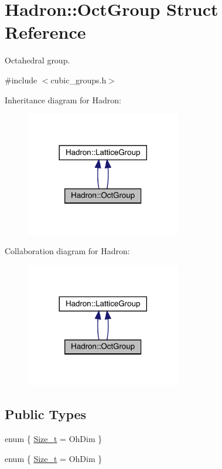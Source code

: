 \hypertarget{structHadron_1_1OctGroup}{}\section{Hadron\+:\+:Oct\+Group Struct Reference}
\label{structHadron_1_1OctGroup}


Octahedral group.  




{\ttfamily \#include $<$cubic\+\_\+groups.\+h$>$}



Inheritance diagram for Hadron\+:\nopagebreak
\begin{figure}[H]
\begin{center}
\leavevmode
\includegraphics[width=192pt]{da/da9/structHadron_1_1OctGroup__inherit__graph}
\end{center}
\end{figure}


Collaboration diagram for Hadron\+:\nopagebreak
\begin{figure}[H]
\begin{center}
\leavevmode
\includegraphics[width=192pt]{df/d0d/structHadron_1_1OctGroup__coll__graph}
\end{center}
\end{figure}
\subsection*{Public Types}
\begin{DoxyCompactItemize}
\item 
enum \{ \mbox{\hyperlink{structHadron_1_1OctGroup_a545f26a6b3e87fcbd91a5f2557e79b1fa6b4fe14565af7dd82a9b9bfa022cfbc6}{Size\+\_\+t}} = Oh\+Dim
 \}
\item 
enum \{ \mbox{\hyperlink{structHadron_1_1OctGroup_a545f26a6b3e87fcbd91a5f2557e79b1fa6b4fe14565af7dd82a9b9bfa022cfbc6}{Size\+\_\+t}} = Oh\+Dim
 \}
\end{DoxyCompactItemize}
